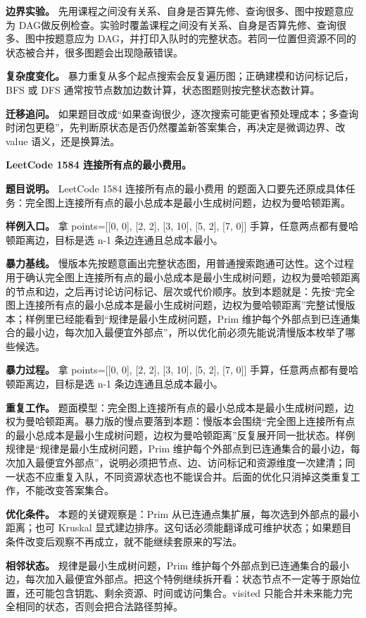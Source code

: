 \textbf{边界实验。} 先用课程之间没有关系、自身是否算先修、查询很多、图中按题意应为 DAG做反例检查。实验时覆盖课程之间没有关系、自身是否算先修、查询很多、图中按题意应为 DAG，并打印入队时的完整状态。若同一位置但资源不同的状态被合并，很多图题会出现隐蔽错误。

\textbf{复杂度变化。} 暴力重复从多个起点搜索会反复遍历图；正确建模和访问标记后，BFS 或 DFS 通常按节点数加边数计算，状态图题则按完整状态数计算。

\textbf{迁移追问。} 如果题目改成“如果查询很少，逐次搜索可能更省预处理成本；多查询时闭包更稳”，先判断原状态是否仍然覆盖新答案集合，再决定是微调边界、改 value 语义，还是换算法。

\noindent\textbf{LeetCode 1584 连接所有点的最小费用。}

\textbf{题目说明。} LeetCode 1584 连接所有点的最小费用 的题面入口要先还原成具体任务：完全图上连接所有点的最小总成本是最小生成树问题，边权为曼哈顿距离。

\textbf{样例入口。} 拿 points=[[0, 0], [2, 2], [3, 10], [5, 2], [7, 0]] 手算，任意两点都有曼哈顿距离边，目标是选 n-1 条边连通且总成本最小。

\textbf{暴力基线。} 慢版本先按题意画出完整状态图，用普通搜索跑通可达性。这个过程用于确认完全图上连接所有点的最小总成本是最小生成树问题，边权为曼哈顿距离的节点和边，之后再讨论访问标记、层次或代价顺序。放到本题就是：先按“完全图上连接所有点的最小总成本是最小生成树问题，边权为曼哈顿距离”完整试慢版本；样例里已经能看到“规律是最小生成树问题，Prim 维护每个外部点到已连通集合的最小边，每次加入最便宜外部点”，所以优化前必须先能说清慢版本枚举了哪些候选。

\textbf{暴力过程。} 拿 points=[[0, 0], [2, 2], [3, 10], [5, 2], [7, 0]] 手算，任意两点都有曼哈顿距离边，目标是选 n-1 条边连通且总成本最小。

\textbf{重复工作。} 题面模型：完全图上连接所有点的最小总成本是最小生成树问题，边权为曼哈顿距离。暴力版的慢点要落到本题：慢版本会围绕“完全图上连接所有点的最小总成本是最小生成树问题，边权为曼哈顿距离”反复展开同一批状态。样例规律是“规律是最小生成树问题，Prim 维护每个外部点到已连通集合的最小边，每次加入最便宜外部点”，说明必须把节点、边、访问标记和资源维度一次建清；同一状态不应重复入队，不同资源状态也不能误合并。后面的优化只消掉这类重复工作，不能改变答案集合。

\textbf{优化条件。} 本题的关键观察是：Prim 从已连通点集扩展，每次选到外部点的最小距离；也可 Kruskal 显式建边排序。这句话必须能翻译成可维护状态；如果题目条件改变后观察不再成立，就不能继续套原来的写法。

\textbf{相邻状态。} 规律是最小生成树问题，Prim 维护每个外部点到已连通集合的最小边，每次加入最便宜外部点。把这个特例继续拆开看：状态节点不一定等于原始位置，还可能包含钥匙、剩余资源、时间或访问集合。visited 只能合并未来能力完全相同的状态，否则会把合法路径剪掉。

